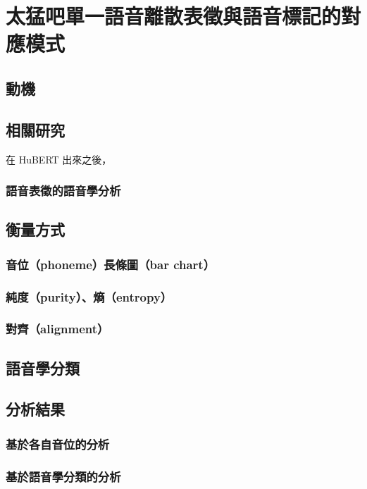 \chapter{  %
    太猛吧單一語音離散表徵與語音標記的對應模式}
\section{動機}  %
\section{相關研究}

在 HuBERT 出來之後，

\subsection{語音表徵的語音學分析}
\section{衡量方式}
\subsection{音位（phoneme）長條圖（bar chart）}
\subsection{純度（purity）、熵（entropy）}
\subsection{對齊（alignment）}
\section{語音學分類}
\section{分析結果}
\subsection{基於各自音位的分析}
\subsection{基於語音學分類的分析}
